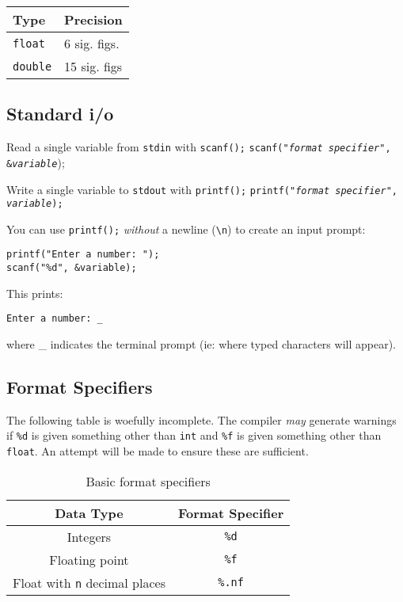 \documentclass{lab}
\begin{document}
\begin{multicols}{2}
\begin{table}[H]
\centering
\begin{tabular}{|l|l|}
\hline
Type & Precision \\
\hline
\texttt{float} & 6 sig. figs. \\
\texttt{double} & 15 sig. figs \\
\hline
\end{tabular}
\end{table}


\subsection{Standard i/o}

Read a single variable from \texttt{stdin} with \texttt{scanf();}
\texttt{scanf("\textit{format specifier}", \&\textit{variable}});

Write a single variable to \texttt{stdout} with \texttt{printf();}
\texttt{printf("\textit{format specifier}", \textit{variable});}

You can use \texttt{printf();} \textit{without} a newline (\texttt{\textbackslash n}) to create an input prompt:

\begin{lstlisting}[style=CStyle]
printf("Enter a number: ");
scanf("%d", &variable);
\end{lstlisting}

This prints:

\texttt{Enter a number: \_}

where \_ indicates the terminal prompt (ie: where typed characters will appear).

\subsection{Format Specifiers}
The following table is woefully incomplete. The compiler \textit{may} generate warnings if \texttt{\%d} is given something other than \texttt{int} and \texttt{\%f} is given something other than \texttt{float}. An attempt will be made to ensure these are sufficient.
\begin{table}[H]
\centering
\begin{tabular}{|c|c|}
\hline
Data Type & Format Specifier \\
\hline
Integers & \texttt{\%d} \\
Floating point & \texttt{\%f} \\
Float with \texttt{n} decimal places & \texttt{\%.nf} \\
\hline
\end{tabular}
\caption{Basic format specifiers}
\end{table}


\end{multicols}
\end{document}
